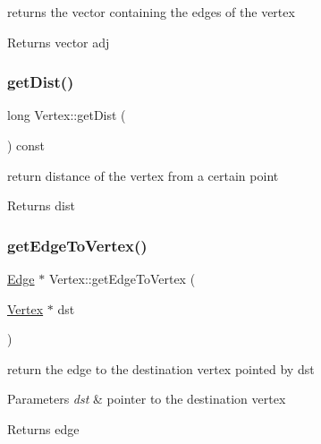 returns the vector containing the edges of the vertex 

\begin{DoxyReturn}{Returns}
vector adj 
\end{DoxyReturn}
\hypertarget{class_vertex_a7f1702326d1d54ea68897d27e68fd1ff}{}\label{class_vertex_a7f1702326d1d54ea68897d27e68fd1ff} 
\subsubsection{\texorpdfstring{get\+Dist()}{getDist()}}
{\footnotesize\ttfamily long Vertex\+::get\+Dist (\begin{DoxyParamCaption}{ }\end{DoxyParamCaption}) const}



return distance of the vertex from a certain point 

\begin{DoxyReturn}{Returns}
dist 
\end{DoxyReturn}
\hypertarget{class_vertex_a2c25e32570b84328b84a256bed0e6c70}{}\label{class_vertex_a2c25e32570b84328b84a256bed0e6c70} 
\subsubsection{\texorpdfstring{get\+Edge\+To\+Vertex()}{getEdgeToVertex()}}
{\footnotesize\ttfamily \hyperlink{class_edge}{Edge} $\ast$ Vertex\+::get\+Edge\+To\+Vertex (\begin{DoxyParamCaption}\item[{\hyperlink{class_vertex}{Vertex} $\ast$}]{dst }\end{DoxyParamCaption})}



return the edge to the destination vertex pointed by dst 


\begin{DoxyParams}{Parameters}
{\em dst} & pointer to the destination vertex\\
\hline
\end{DoxyParams}
\begin{DoxyReturn}{Returns}
edge 
\end{DoxyReturn}
\hypertarget{class_vertex_aa87c2ee75727a9fe1f53379d3ff7632e}{}\label{class_vertex_aa87c2ee75727a9fe1f53379d3ff7632e} 
